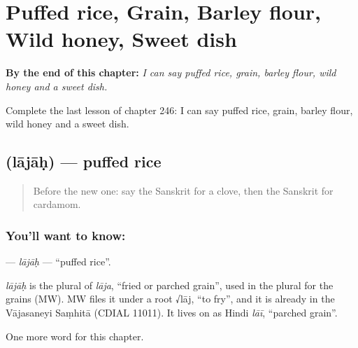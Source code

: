 
\chapter{Puffed rice, Grain, Barley flour, Wild honey, Sweet dish}
\label{ch:sa-puffed-rice-grain-barley-flour-wild-honey-sweet-dish}

\begin{chapteropening}
\textbf{By the end of this chapter:} \emph{I can say puffed rice, grain, barley flour, wild honey and a sweet dish.}

Complete the last lesson of chapter 246: I can say puffed rice, grain, barley flour, wild honey and a sweet dish.
\end{chapteropening}

\section[\texorpdfstring{\sk{लाजाः} (lājāḥ)}{लाजाः (lājāḥ)}]{ (lājāḥ) — puffed rice}

\label{lesson:SA-C246-lajah}



\begin{quote}
Before the new one: say the Sanskrit for a clove, then the Sanskrit for cardamom.
\end{quote}

\subsection*{You'll want to know: }
\textbf{} — \emph{lājāḥ} — \textquotedblleft{}puffed rice\textquotedblright{}.

\begin{cousinweb}
\emph{lājāḥ} is the plural of \emph{lāja}, \textquotedblleft{}fried or parched grain\textquotedblright{}, used in the plural for the grains (MW). MW files it under a root √lāj, \textquotedblleft{}to fry\textquotedblright{}, and it is already in the Vājasaneyi Saṃhitā (CDIAL 11011). It lives on as Hindi \emph{lāī}, \textquotedblleft{}parched grain\textquotedblright{}.
\end{cousinweb}

\begin{grammarlens}[title={What you've built}]
One more word for this chapter.
\end{grammarlens}

